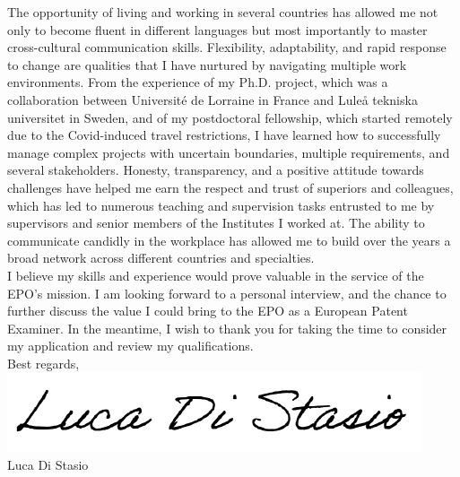 \documentclass[
  a4paper, 
]{fortysecondscv}
\begin{document}
The opportunity of living and working in several countries has allowed me not only to become fluent in different languages but most importantly to master cross-cultural communication skills. Flexibility, adaptability, and rapid response to change are qualities that I have nurtured by navigating multiple work environments. From the experience of my Ph.D. project, which was a collaboration between Universit{\'e} de Lorraine in France and Lule{\aa} tekniska universitet in Sweden, and of my postdoctoral fellowship, which started remotely due to the Covid-induced travel restrictions, I have learned how to successfully manage complex projects with uncertain boundaries, multiple requirements, and several stakeholders. Honesty, transparency, and a positive attitude towards challenges have helped me earn the respect and trust of superiors and colleagues, which has led to numerous teaching and supervision tasks entrusted to me by supervisors and senior members of the Institutes I worked at. The ability to communicate candidly in the workplace has allowed me to build over the years a broad network across different countries and specialties.\\[6pt]
I believe my skills and experience would prove valuable in the service of the EPO's mission. I am looking forward to a personal interview, and the chance to further discuss the value I could bring to the EPO as a European Patent Examiner. In the meantime, I wish to thank you for taking the time to consider my application and review my
qualifications.\\[12pt]
Best regards,\\
\includegraphics[scale=0.75]{Signature.png}\\
Luca Di Stasio
\end{document}
